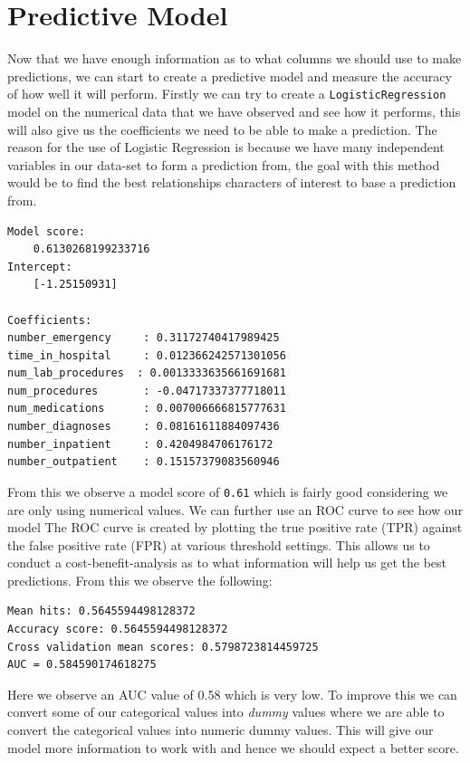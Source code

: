 \documentclass[11pt]{report}
\begin{document}
\newpage
\section{Predictive Model}
\noindent
Now that we have enough information as to what columns we should use to make predictions, we can start to create a predictive model and measure the accuracy of how well it will perform. Firstly we can try to create a \texttt{LogisticRegression} model on the numerical data that we have observed and see how it performs, this will also give us the coefficients we need to be able to make a prediction. The reason for the use of Logistic Regression is because we have many independent variables in our data-set to form a prediction from, the goal with this method would be to find the best relationships characters of interest to base a prediction from. 

\begin{lstlisting}
Model score:
	0.6130268199233716
Intercept:
	[-1.25150931]
	
Coefficients:
number_emergency     : 0.31172740417989425
time_in_hospital     : 0.012366242571301056
num_lab_procedures  : 0.0013333635661691681
num_procedures       : -0.04717337377718011
num_medications      : 0.007006666815777631
number_diagnoses     : 0.08161611884097436
number_inpatient     : 0.4204984706176172
number_outpatient    : 0.15157379083560946
\end{lstlisting}
\noindent
From this we observe a model score of \texttt{0.61} which is fairly good considering we are only using numerical values. We can further use an ROC curve to see how our model The ROC curve is created by plotting the true positive rate (TPR) against the false positive rate (FPR) at various threshold settings. This allows us to conduct a cost-benefit-analysis as to what information will help us get the best predictions. From this we observe the following:

\begin{lstlisting}
Mean hits: 0.5645594498128372
Accuracy score: 0.5645594498128372
Cross validation mean scores: 0.5798723814459725
AUC = 0.584590174618275
\end{lstlisting}

\noindent
Here we observe an AUC value of 0.58 which is very low. To improve this we can convert some of our categorical values into \textit{dummy} values where we are able to convert the categorical values into numeric dummy values. This will give our model more information to work with and hence we should expect a better score. 
\end{document}
